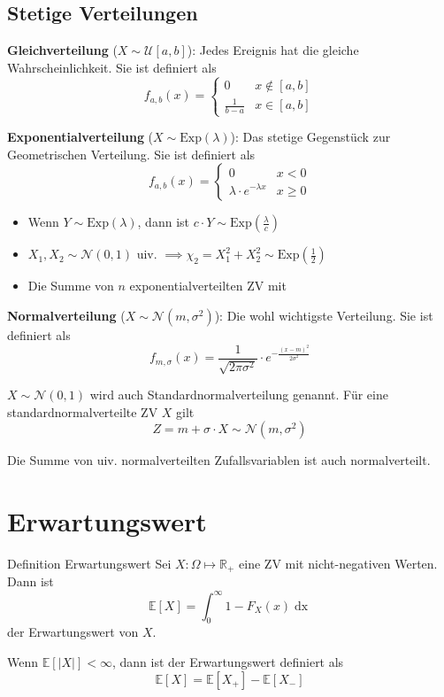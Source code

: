 \documentclass[a4paper,10pt]{article}
\def\R{\mathbb{R}}
\def\E{\mathbb{E}}
\begin{document}
\subsection{Stetige Verteilungen}
\textbf{Gleichverteilung} (\(X \sim \mathcal{U}[a,b]\)): Jedes Ereignis hat die gleiche Wahrscheinlichkeit. Sie ist definiert als
\[f_{a,b}(x) = \begin{cases}
		0             & x \notin [a,b] \\
		\frac{1}{b-a} & x \in [a,b]
	\end{cases}\]

\noindent \textbf{Exponentialverteilung} (\(X \sim \text{Exp}(\lambda)\)): Das stetige Gegenstück zur Geometrischen Verteilung. Sie ist definiert als
\[f_{a,b}(x) = \begin{cases}
		0                            & x < 0    \\
		\lambda \cdot e^{-\lambda x} & x \geq 0
	\end{cases}\]
\begin{itemize}
	\item Wenn \(Y\sim \text{Exp}(\lambda)\), dann ist \(c \cdot Y \sim \text{Exp}(\frac{\lambda}{c})\)
	\item \(X_1, X_2 \sim \mathcal{N}(0,1)\) uiv. \(\implies \chi_2 = X_1^2 +X_2^2 \sim \text{Exp}(\frac{1}{2})\)
	\item Die Summe von $n$ exponentialverteilten ZV mit 
\end{itemize}

\noindent \textbf{Normalverteilung} (\(X \sim \mathcal{N}(m, \sigma^2)\)): Die wohl wichtigste Verteilung. Sie ist definiert als
\[f_{m, \sigma}(x) = \frac{1}{\sqrt{2 \pi \sigma^2}} \cdot e^{-\frac{(x-m)^2}{2 \sigma^2}}\]

\(X \sim \mathcal{N}(0,1)\) wird auch Standardnormalverteilung genannt. Für eine standardnormalverteilte ZV \(X\) gilt
\[Z = m +\sigma \cdot X \sim \mathcal{N}(m, \sigma^2)\]

Die Summe von uiv. normalverteilten Zufallsvariablen ist auch normalverteilt.

\section{Erwartungswert}
\begin{mainbox}{Definition Erwartungswert}
	Sei \(X: \Omega \mapsto \R_+\) eine ZV mit nicht-negativen Werten. Dann ist
	\[\E[X] = \int_0^\infty 1- F_X(x) \mathop{dx}\]
	der Erwartungswert von \(X\).
\end{mainbox}
Wenn \(\E[|X|] < \infty\), dann ist der Erwartungswert definiert als
\[\E[X] = \E[X_+] - \E[X_-]\]
\end{document}
